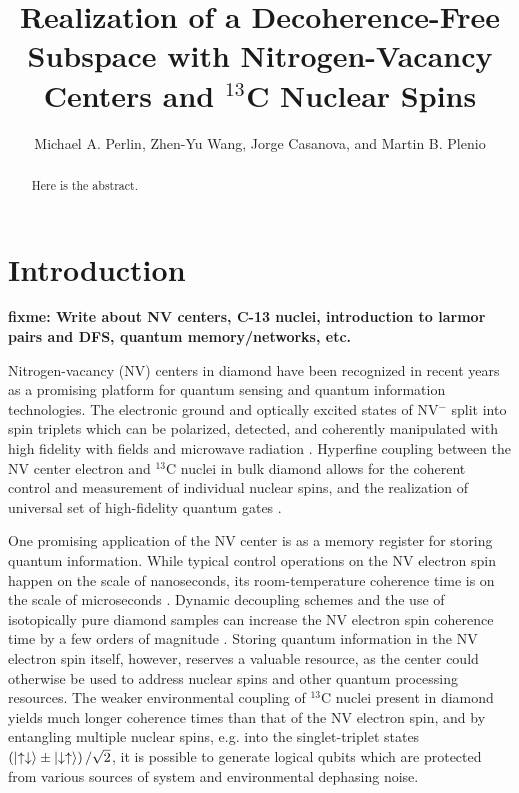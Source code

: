 \documentclass[twocolumn]{revtex4-1}
\newcommand{\p}[1]{\left(#1\right)} %
\renewcommand{\u}{\uparrow}
\renewcommand{\d}{\downarrow}
\newcommand{\fixme}[1]{{\bf \color{red} fixme: #1}}
\begin{document}
\title{Realization of a Decoherence-Free Subspace with
  Nitrogen-Vacancy Centers and $^{13}$C Nuclear Spins}

\author{Michael A. Perlin, Zhen-Yu Wang, Jorge Casanova, and Martin
  B. Plenio}


\begin{abstract}
  Here is the abstract.
\end{abstract}

\maketitle

\section{Introduction}

\fixme{Write about NV centers, C-13 nuclei, introduction to larmor
  pairs and DFS, quantum memory/networks, etc.}

Nitrogen-vacancy (NV) centers in diamond have been recognized in
recent years as a promising platform for quantum sensing and quantum
information technologies\cite{mamin2013nanoscale, steinert2010high,
  wang2016positioning, chou2015optimal, childress2006fault,
  yao2012scalable}. The electronic ground and optically excited states
of NV$^-$ split into spin triplets which can be polarized, detected,
and coherently manipulated with high fidelity with fields and
microwave radiation \cite{dobrovitski2013quantum}. Hyperfine coupling
between the NV center electron and $^{13}$C nuclei in bulk diamond
allows for the coherent control and measurement of individual nuclear
spins, and the realization of universal set of high-fidelity quantum
gates \cite{dobrovitski2013quantum, casanova2016noise}.

One promising application of the NV center is as a memory register for
storing quantum information. While typical control operations on the
NV electron spin happen on the scale of nanoseconds, its
room-temperature coherence time is on the scale of microseconds
\cite{dobrovitski2013quantum}. Dynamic decoupling schemes and the use
of isotopically pure diamond samples can increase the NV electron spin
coherence time by a few orders of magnitude
\cite{ryan2010robust}. Storing quantum information in the NV electron
spin itself, however, reserves a valuable resource, as the center
could otherwise be used to address nuclear spins and other quantum
processing resources. The weaker environmental coupling of $^{13}$C
nuclei present in diamond yields much longer coherence times than that
of the NV electron spin, and by entangling multiple nuclear spins,
e.g. into the singlet-triplet states
$\p{\ket{\u\d}\pm\ket{\d\u}}/\sqrt2$, it is possible to generate
logical qubits which are protected from various sources of system and
environmental dephasing noise.
\end{document}
